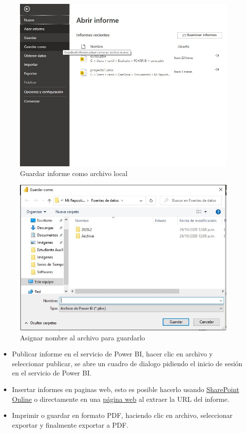 \documentclass[
]{book}
\begin{document}
\begin{figure}

{\centering \includegraphics[width=0.6\linewidth]{Imágenes/powerbi1} 

}

\caption{Guardar informe como archivo local}\label{fig:guardarinforme-fig}
\end{figure}

\begin{figure}

{\centering \includegraphics[width=0.6\linewidth]{Imágenes/powerbi2} 

}

\caption{Asignar nombre al archivo para guardarlo}\label{fig:guardararchivo2-fig}
\end{figure}

\begin{itemize}
\item
  Publicar informe en el servicio de Power BI, hacer clic en archivo y seleccionar publicar, se abre un cuadro de dialogo pidiendo el inicio de sesión en el servicio de Power BI.
\item
  Insertar informes en paginas web, esto es posible hacerlo usando \href{https://docs.microsoft.com/es-es/power-bi/collaborate-share/service-embed-report-spo}{SharePoint Online} o directamente en una \href{https://docs.microsoft.com/es-es/power-bi/collaborate-share/service-embed-secure}{página web} al extraer la URL del informe.
\item
  Imprimir o guardar en formato PDF, haciendo clic en archivo, seleccionar exportar y finalmente exportar a PDF.
\end{itemize}
\end{document}

